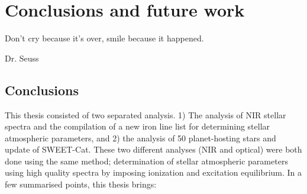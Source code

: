 \chapter{Conclusions and future work}
\label{cha:future}
\epigraph{Don't cry because it's over, smile because it happened.}{Dr. Seuss}

\section{Conclusions}

This thesis consisted of two separated analysis. 1) The analysis of NIR stellar spectra and the
compilation of a new iron line list for determining stellar atmospheric parameters, and 2) the
analysis of 50 planet-hosting stars and update of SWEET-Cat. These two different analyses (NIR and
optical) were both done using the same method; determination of stellar atmospheric parameters using
high quality spectra by imposing ionization and excitation equilibrium. In a few summarised points,
this thesis brings:

